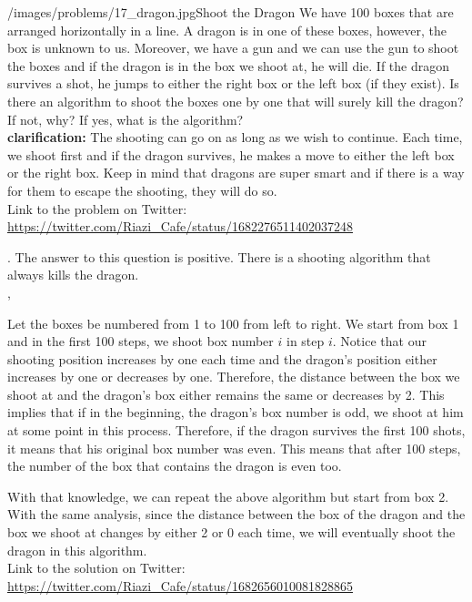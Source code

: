 \begin{problem}{/images/problems/17_dragon.jpg}{Shoot the Dragon}
    We have 100 boxes that are arranged horizontally in a line. A dragon is in one of these boxes, however, the box is unknown to us. Moreover, we have a gun and we can use the gun to shoot the boxes and if the dragon is in the box we shoot at, he will die. If the dragon survives a shot, he jumps to either the right box or the left box (if they exist). Is there an algorithm to shoot the boxes one by one that will surely kill the dragon? If not, why? If yes, what is the algorithm?\\[0.2cm]

\textbf{clarification:} The shooting can go on as long as we wish to continue. Each time, we shoot first and if the dragon survives, he makes a move to either the left box or the right box. Keep in mind that dragons are super smart and if there is a way for them to escape the shooting, they will do so.\\[0.2cm]

 Link to the problem on Twitter: \url{https://twitter.com/Riazi_Cafe/status/1682276511402037248}
\end{problem}
\begin{solution}.
The answer to this question is positive. There is a shooting algorithm that always kills the dragon. \\[0.2cm], 

Let the boxes be numbered from 1 to 100 from left to right. We start from box 1 and in the first 100 steps, we shoot box number $i$ in step $i$. Notice that our shooting position increases by one each time and the dragon's position either increases by one or decreases by one. Therefore, the distance between the box we shoot at and the dragon's box either remains the same or decreases by 2. This implies that if in the beginning, the dragon's box number is odd, we shoot at him at some point in this process. Therefore, if the dragon survives the first 100 shots, it means that his original box number was even. This means that after 100 steps, the number of the box that contains the dragon is even too.

With that knowledge, we can repeat the above algorithm but start from box 2. With the same analysis, since the distance between the box of the dragon and the box we shoot at changes by either 2 or 0 each time, we will eventually shoot the dragon in this algorithm.\\[0.2cm]

Link to the solution on Twitter:  \url{https://twitter.com/Riazi_Cafe/status/1682656010081828865}
\end{solution}